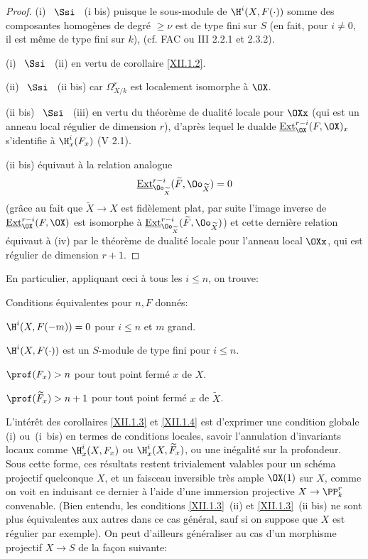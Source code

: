 \begin{proof}
(i) ~$\Ssi$~ (i bis) puisque le sous-module de $\H^i(X, F(\cdot))$ somme des composantes homog\`enes de degr\'e $\geq \nu$ est de type fini sur $S$ (en fait, pour $i\neq 0$, il est m\^eme de type fini sur $k$), (cf. FAC ou \EGA III 2.2.1 et 2.3.2).

(i) ~$\Ssi$~ (ii) en vertu de corollaire \ref{XII.1.2}.

(ii) ~$\Ssi$~ (ii bis) car $\Omega_{X/k}^r$ est localement isomorphe \`a $\OX$.

(ii bis) ~$\Ssi$~ (iii) en vertu du th\'eor\`eme de dualit\'e locale pour $\OXx$ (qui est un anneau local r\'egulier de dimension $r$), d'apr\`es lequel le \og dual\fg de $\mathop{\underline{\mathrm{Ext}}}\nolimits^{r-i}_{\OX}(F, \OX)_x$ s'identifie \`a $\H^i_x(F_x)$ (V 2.1).

(ii bis) \'equivaut \`a la relation analogue
\[
\mathop{\underline{\mathrm{Ext}}}\nolimits^{r-i}_{\Oo_{\widetilde{X}}}(\widetilde{F}, \Oo_{\widetilde{X}})=0
\]
(gr\^ace au fait que $\widetilde{X}\to X$ est fid\`element plat, par suite l'image inverse de $\mathop{\underline{\mathrm{Ext}}}\nolimits^{r-i}_{\OX}(F, \OX)$ est isomorphe \`a $\mathop{\underline{\mathrm{Ext}}}\nolimits^{r-i}_{\Oo_{\widetilde{X}}}(\widetilde{F}, \Oo_{\widetilde{X}})$) et cette derni\`ere relation \'equivaut \`a (iv) par le th\'eor\`eme de dualit\'e locale pour l'anneau local $\OXx$, qui est r\'egulier de dimension $r+1$.
\skipqed
\end{proof}

En particulier, appliquant ceci \`a tous les $i\leq n$, on trouve:

\begin{corollaire} \label{XII.1.4}
Conditions \'equivalentes pour $n, F$ donn\'es:
\begin{enumeratei}
\item
$\H^i(X, F(-m))=0$ pour $i\leq n$ et $m$ grand.
\item[\textup{(i bis)}] $\H^i(X, F(\cdot))$ est un $S$-module de type fini pour $i\leq n$.
\item
$\prof(F_x)>n$ pour tout point ferm\'e $x$ de $X$.
\item
$\prof(\widetilde{F}_x)>n+1$ pour tout point ferm\'e $x$ de $\widetilde{X}$.
\end{enumeratei}
\end{corollaire}

L'int\'er\^et des corollaires \ref{XII.1.3} et \ref{XII.1.4} est d'exprimer une condition globale (i) ou~(i~bis) en termes de conditions locales, \ignorespaces savoir l'annulation d'invariants locaux comme $\H_x^i(X, F_x)$ ou $\H_x^i(X, \widetilde{F}_x)$, ou une in\'egalit\'e sur la profondeur. Sous cette forme, ces r\'esultats restent trivialement valables pour un sch\'ema projectif quelconque $X$, et un faisceau inversible tr\`es ample $\OX(1)$ sur $X$, comme on voit en induisant ce dernier \`a l'aide d'une immersion projective $X\to\PP_k^r$ convenable. (Bien entendu, les conditions \ref{XII.1.3}~(ii) et \ref{XII.1.3}~(ii bis) ne sont plus \'equivalentes aux autres dans ce cas g\'en\'eral, sauf si on suppose que $X$ est r\'egulier par exemple). On peut d'ailleurs g\'en\'eraliser au cas d'un morphisme projectif $X\to S$ de la fa\c con suivante:

